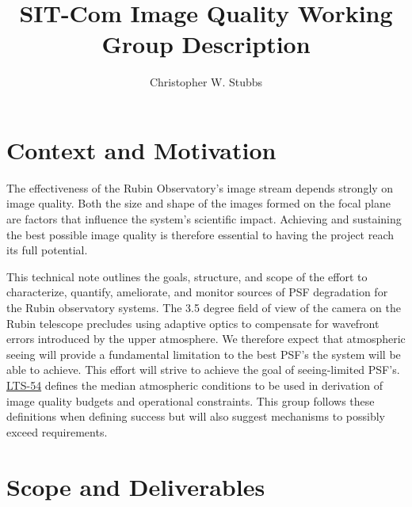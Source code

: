 \documentclass[SE,authoryear,toc]{lsstdoc}
\title{SIT-Com Image Quality Working Group Description}
\author{%
Christopher W. Stubbs
}
\date{\vcsDate}
\begin{document}
\maketitle


\section{Context and Motivation}

The effectiveness of the Rubin Observatory's image stream depends strongly on image quality.
Both the size and shape of the images formed on the focal plane are factors that influence the system's scientific impact.
Achieving and sustaining the best possible image quality is therefore essential to having the project reach its full potential.

This technical note outlines the goals, structure, and scope of the effort to characterize, quantify, ameliorate, and monitor sources of PSF degradation for the Rubin observatory systems.
The 3.5 degree field of view of the camera on the Rubin telescope precludes using adaptive optics to compensate for wavefront errors introduced by the upper atmosphere.
We therefore expect that atmospheric seeing will provide a fundamental limitation to the best PSF's the system will be able to achieve.
This effort will strive to achieve the goal of seeing-limited PSF's.
\href{https://ls.st/LTS-54}{LTS-54} defines the median atmospheric conditions to be used in derivation of image quality budgets and operational constraints.
This group follows these definitions when defining success but will also suggest mechanisms to possibly exceed requirements.

\section{Scope and Deliverables}
\end{document}
